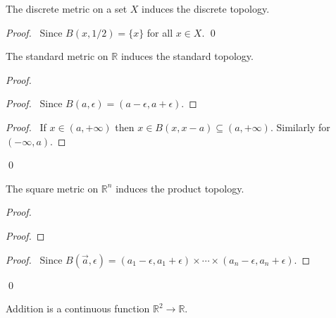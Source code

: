 \begin{prop}
The discrete metric on a set $X$ induces the discrete topology.
\end{prop}

\begin{proof}
\pf\ Since $B(x, 1/2) = \{x\}$ for all $x \in X$. \qed
\end{proof}

\begin{prop}
The standard metric on $\mathbb{R}$ induces the standard topology.
\end{prop}

\begin{proof}
\pf
{}
\begin{proof}
	\pf\ Since $B(a, \epsilon) = (a - \epsilon, a + \epsilon)$.
\end{proof}
\begin{proof}
	\pf\ If $x \in (a, +\infty)$ then $x \in B(x,x-a) \subseteq (a, + \infty)$. Similarly for $(-\infty, a)$.
\end{proof}
\qed
\end{proof}

\begin{prop}
The square metric on $\mathbb{R}^n$ induces the product topology.
\end{prop}

\begin{proof}
\pf
{}
\begin{proof}
\end{proof}
\begin{proof}
	\pf\ Since $B(\vec{a}, \epsilon) = (a_1 - \epsilon, a_1 + \epsilon) \times \cdots \times (a_n - \epsilon, a_n + \epsilon)$.
\end{proof}
\qed
\end{proof}

\begin{prop}
\label{prop:addition_continuous}
Addition is a continuous function $\mathbb{R}^2 \rightarrow \mathbb{R}$.
\end{prop}

